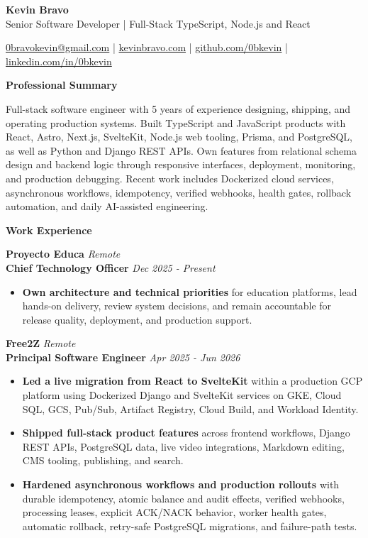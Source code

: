 \documentclass[10pt]{article}
\newcommand{\sectiontitle}[1]{%
    \vspace{4pt}
    \begin{center}
        \textbf{#1}
    \end{center}
    \vspace{-5pt}
}
\begin{document}
\raggedright

\begin{center}
    {\LARGE \textbf{Kevin Bravo}}\\
    Senior Software Developer | Full-Stack TypeScript, Node.js and React \\
    \hrulefill
\end{center}

\begin{center}
    \href{mailto:0bravokevin@gmail.com}{0bravokevin@gmail.com}
    | \href{https://kevinbravo.com}{kevinbravo.com}
    | \href{https://github.com/0bkevin}{github.com/0bkevin}
    | \href{https://www.linkedin.com/in/0bkevin/}{linkedin.com/in/0bkevin}
\end{center}

\fontsize{9.7}{10.85}\selectfont

\sectiontitle{Professional Summary}
Full-stack software engineer with 5 years of experience designing, shipping, and operating production systems. Built TypeScript and JavaScript products with React, Astro, Next.js, SvelteKit, Node.js web tooling, Prisma, and PostgreSQL, as well as Python and Django REST APIs. Own features from relational schema design and backend logic through responsive interfaces, deployment, monitoring, and production debugging. Recent work includes Dockerized cloud services, asynchronous workflows, idempotency, verified webhooks, health gates, rollback automation, and daily AI-assisted engineering.

\sectiontitle{Work Experience}

\textbf{Proyecto Educa} \hfill \textit{Remote} \\
\textbf{Chief Technology Officer} \hfill \textit{Dec 2025 - Present}
\begin{itemize}
    \item \textbf{Own architecture and technical priorities} for education platforms, lead hands-on delivery, review system decisions, and remain accountable for release quality, deployment, and production support.
\end{itemize}

\vspace{2pt}
\textbf{Free2Z} \hfill \textit{Remote} \\
\textbf{Principal Software Engineer} \hfill \textit{Apr 2025 - Jun 2026}
\begin{itemize}
    \item \textbf{Led a live migration from React to SvelteKit} within a production GCP platform using Dockerized Django and SvelteKit services on GKE, Cloud SQL, GCS, Pub/Sub, Artifact Registry, Cloud Build, and Workload Identity.
    \item \textbf{Shipped full-stack product features} across frontend workflows, Django REST APIs, PostgreSQL data, live video integrations, Markdown editing, CMS tooling, publishing, and search.
    \item \textbf{Hardened asynchronous workflows and production rollouts} with durable idempotency, atomic balance and audit effects, verified webhooks, processing leases, explicit ACK/NACK behavior, worker health gates, automatic rollback, retry-safe PostgreSQL migrations, and failure-path tests.
\end{itemize}
\end{document}
